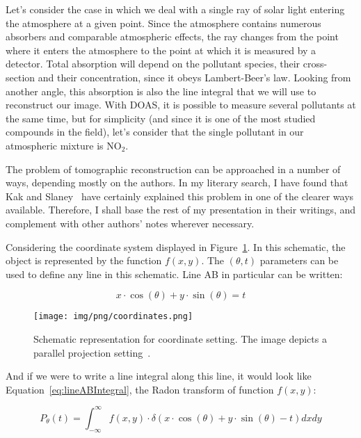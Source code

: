 Let's consider the case in which we deal with a single ray of solar
light entering the atmosphere at a given point. Since the atmosphere
contains numerous absorbers and comparable atmospheric effects, the ray
changes from the point where it enters the atmosphere to the point at
which it is measured by a detector. Total absorption will depend on the
pollutant species, their cross-section and their concentration, since it
obeys Lambert-Beer's law. Looking from another angle, this absorption
is also the line integral that we will use to reconstruct our image.
With \gls{DOAS}, it is possible to measure several pollutants at the
same time, but for simplicity (and since it is one of the most studied
compounds in the field), let's consider that the single pollutant in our
atmospheric mixture is NO$_2$.

The problem of tomographic reconstruction can be approached in a number
of ways, depending mostly on the authors. In my literary search, I have
found that Kak and Slaney~\cite{Kak2001} have certainly explained this
problem in one of the clearer ways available. Therefore, I shall base
the rest of my presentation in their writings, and complement with other
authors' notes wherever necessary.

Considering the coordinate system displayed in
Figure~\ref{fig:coordinates}. In this schematic, the object is
represented by the function $f(x, y)$. The  $(\theta, t)$ parameters can
be used to define any line in this schematic. Line AB in particular can
be written:

\begin{equation}
    \label{eq:lineAB}
    x \cdot \cos(\theta) + y \cdot \sin(\theta) = t
\end{equation}

\begin{figure}[htpb]
    \centering
    \texttt{[image: img/png/coordinates.png]}
    \caption{Schematic representation for coordinate setting. The image
    depicts a parallel projection setting~\cite{Kak2001a}.}
    \label{fig:coordinates}
\end{figure}

And if we were to write a line integral along this line, it would look
like Equation~\ref{eq:lineABIntegral}, the Radon transform of function
$f(x, y)$:

\begin{equation}
    \label{eq:lineABIntegral}
    P_{\theta}(t) = \int_{-\infty}^{\infty} f(x, y) \cdot \delta(x \cdot
    \cos(\theta) + y \cdot \sin(\theta) - t) dxdy
\end{equation}

